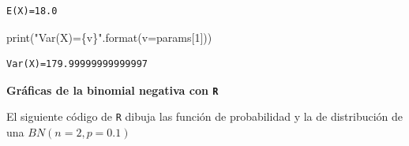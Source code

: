 \documentclass[
  letterpaper,
  DIV=11,
  numbers=noendperiod]{scrreprt}
\newenvironment{Shaded}{\begin{snugshade}}{\end{snugshade}}
\newcommand{\BuiltInTok}[1]{\textcolor[rgb]{0.00,0.23,0.31}{#1}}
\newcommand{\DecValTok}[1]{\textcolor[rgb]{0.68,0.00,0.00}{#1}}
\newcommand{\NormalTok}[1]{\textcolor[rgb]{0.00,0.23,0.31}{#1}}
\newcommand{\OperatorTok}[1]{\textcolor[rgb]{0.37,0.37,0.37}{#1}}
\newcommand{\SpecialCharTok}[1]{\textcolor[rgb]{0.37,0.37,0.37}{#1}}
\newcommand{\StringTok}[1]{\textcolor[rgb]{0.13,0.47,0.30}{#1}}
\begin{document}
\begin{verbatim}
E(X)=18.0
\end{verbatim}

\begin{Shaded}
\begin{Highlighting}[]
\BuiltInTok{print}\NormalTok{(}\StringTok{"Var(X)=}\SpecialCharTok{\{v\}}\StringTok{"}\NormalTok{.}\BuiltInTok{format}\NormalTok{(v}\OperatorTok{=}\NormalTok{params[}\DecValTok{1}\NormalTok{]))}
\end{Highlighting}
\end{Shaded}

\begin{verbatim}
Var(X)=179.99999999999997
\end{verbatim}

\textbf{Gráficas de la binomial negativa con \texttt{R}}

El siguiente código de \texttt{R} dibuja las función de probabilidad y
la de distribución de una \(BN(n=2,p=0.1)\)
\end{document}
